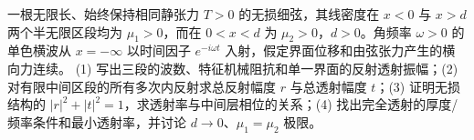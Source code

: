 一根无限长、始终保持相同静张力 \(T>0\) 的无损细弦，其线密度在 \(x<0\) 与 \(x>d\) 两个半无限区段均为 \(\mu_1>0\)，而在 \(0<x<d\) 为 \(\mu_2>0\)，\(d>0\)。角频率 \(\omega>0\) 的单色横波从 \(x=-\infty\) 以时间因子 \(e^{-i\omega t}\) 入射，假定界面位移和由弦张力产生的横向力连续。
(1) 写出三段的波数、特征机械阻抗和单一界面的反射透射振幅；(2) 对有限中间区段的所有多次内反射求总反射幅度 \(r\) 与总透射幅度 \(t\)；(3) 证明无损结构的 \(|r|^2+|t|^2=1\)，求透射率与中间层相位的关系；(4) 找出完全透射的厚度/频率条件和最小透射率，并讨论 \(d\to0\)、\(\mu_1=\mu_2\) 极限。
